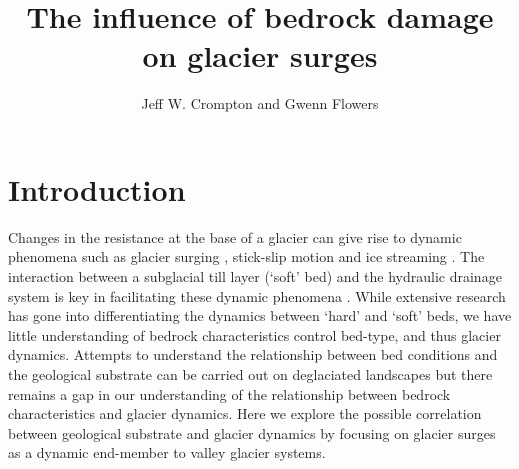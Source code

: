 \documentclass[review]{igs}
\begin{document}
\title[Glacier surge propensity controlled by bedrock fracture characteristics]{The influence of bedrock damage on glacier surges}

\author[Crompton]{Jeff W. Crompton and Gwenn Flowers}


\abstract{
}

\maketitle

\section{Introduction}

Changes in the resistance at the base of a glacier can give rise to dynamic phenomena such as glacier surging \citep{Meier1969}, stick-slip motion \citep[e.g][]{Bindschadler2003} and ice streaming \citep[e.g.][]{Alley1987}. The interaction between a subglacial till layer (`soft' bed) and the hydraulic drainage system is key in facilitating these dynamic phenomena \citep[e.g.][]{Harrison2003,Tulaczyk2000a,Lipovsky2016}. While extensive research has gone into differentiating the dynamics between `hard' and `soft' beds, we have little understanding of bedrock characteristics control bed-type, and thus glacier dynamics. Attempts to understand the relationship between bed conditions and the geological substrate can be carried out on deglaciated landscapes \citep[e.g.][]{Gordon1981,Hooyer2012} but there remains a gap in our understanding of the relationship between bedrock characteristics and glacier dynamics. Here we explore the possible correlation between geological substrate and glacier dynamics by focusing on glacier surges as a dynamic end-member to valley glacier systems. 
\end{document}
